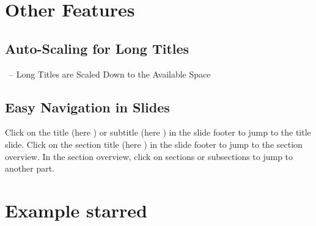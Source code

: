 \documentclass[
	aspectratio=169, %
	8pt, %
	english, %
]{beamer}
\begin{document}
\section{Other Features}

\subsection{Auto-Scaling for Long Titles}
\begin{frame}{\insertsubsection\ -- Long Titles are Scaled Down to the Available Space}
\end{frame}

\subsection{Easy Navigation in Slides}
\begin{frame}{\insertsubsection}
	\vfill
	Click on the title (here \textbf{\insertshorttitle}) or subtitle (here \textbf{\insertshortsubtitle}) in the slide footer to jump to the title slide.
	\vfill
	Click on the section title (here \textbf{\insertsection}) in the slide footer to jump to the section overview.
	\vfill
	In the section overview, click on sections or subsections to jump to another part.
	\vfill
\end{frame}
\section*{Example starred}
\lectureoverview
\end{document}
